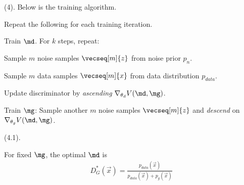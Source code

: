 \documentclass[11pt]{article}
\begin{document}
\myspace
\p {} (4). Below is the training algorithm.
\begin{algorithm}
	Repeat the following for each training iteration.
	
	\begin{compactenum}
		\item Train $\md$. For $k$ steps, repeat:
		\begin{compactenum}
			\item Sample $m$ noise samples $\vecseq[m]{z}$ from noise prior $p_n$. 
			
			\item Sample $m$ data samples $\vecseq[m]{x}$ from data distribution $p_{data}$. 
			
			\item Update discriminator by \textit{ascending} $\nabla_{\theta_d} V(\md, \mg)$.
		\end{compactenum}
		
		\item Train $\mg$: Sample another $m$ noise samples $\vecseq[m]{z}$ and \textit{descend} on $\nabla_{\theta_g} V(\md, \mg)$. 
	\end{compactenum}
\end{algorithm}

\myspace
\p {} (4.1). 

\begin{definition}[-1em][Proposition 1]
	For fixed $\mg$, the optimal $\md$ is 
	\begin{align}
	D_G^*(\vec x) = \frac{ p_{data}(\vec x) }{ p_{data}(\vec x) + p_g(\vec x) } \label{eq:gans-2}
	\end{align}
\end{definition}
\end{document}
